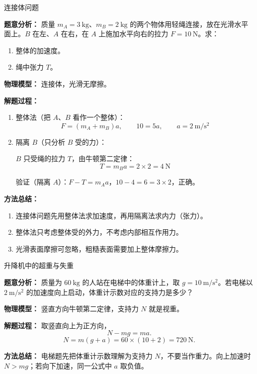 \begin{examplebox}{连接体问题}

\textbf{题意分析：} 质量 $m_A = 3\ \mathrm{kg}$、$m_B = 2\ \mathrm{kg}$ 的两个物体用轻绳连接，放在光滑水平面上。$B$ 在左、$A$ 在右，在 $A$ 上施加水平向右的拉力 $F = 10\ \mathrm{N}$。求：
\begin{enumerate}
  \item 整体的加速度。
  \item 绳中张力 $T$。
\end{enumerate}

\textbf{物理模型：} 连接体，光滑无摩擦。

\begin{center}


\label{fig:example-newton-connected}
\end{center}

\textbf{解题过程：}

\begin{enumerate}
  \item 整体法（把 $A$、$B$ 看作一个整体）：
  \[
  F = (m_A + m_B) a,\qquad 10 = 5a,\qquad a = 2\ \mathrm{m/s^2}
  \]

  \item 隔离 $B$（只分析 $B$ 受的力）：

  $B$ 只受绳的拉力 $T$，由牛顿第二定律：
  \[
  T = m_B a = 2 \times 2 = 4\ \mathrm{N}
  \]

  验证（隔离 $A$）：$F - T = m_A a$，$10 - 4 = 6 = 3 \times 2$，正确。
\end{enumerate}

\textbf{方法总结：}
\begin{enumerate}
  \item 连接体问题先用整体法求加速度，再用隔离法求内力（张力）。
  \item 整体法只考虑整体受的外力，不考虑内部相互作用力。
  \item 光滑表面摩擦可忽略，粗糙表面需要加上整体摩擦力。
\end{enumerate}

\end{examplebox}

\begin{examplebox}{升降机中的超重与失重}

\textbf{题意分析：} 质量为 $60\ \mathrm{kg}$ 的人站在电梯中的体重计上，取 $g=10\ \mathrm{m/s^2}$。若电梯以 $2\ \mathrm{m/s^2}$ 的加速度向上启动，体重计示数对应的支持力是多少？

\textbf{物理模型：} 竖直方向牛顿第二定律，支持力 $N$ 就是视重。

\textbf{解题过程：} 取竖直向上为正方向，
\[
N-mg=ma.
\]
\[
N=m(g+a)=60\times(10+2)=720\ \mathrm{N}.
\]

\textbf{方法总结：} 电梯题先把体重计示数理解为支持力 $N$，不要当作重力。向上加速时 $N>mg$；若向下加速，同一公式中 $a$ 取负值。
\end{examplebox}

